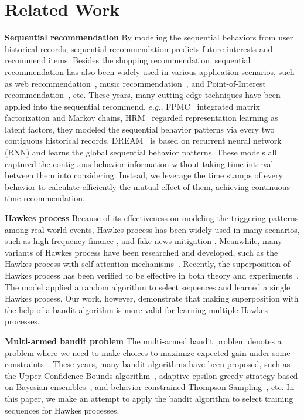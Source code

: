 \documentclass[runningheads]{llncs}
\begin{document}
\section{Related Work}
\textbf{Sequential recommendation}
By modeling the sequential behaviors from user historical records, sequential recommendation predicts future interests and recommend items. Besides the shopping recommendation, sequential recommendation has also been widely used in various application scenarios, such as web recommendation~\cite{zhang2015task}, music recommendation~\cite{chen2012playlist}, and Point-of-Interest recommendation~\cite{cheng2013you,feng2015personalized}, etc.
These years, many cutting-edge techniques have been applied into the sequential recommend, $e.g.$, FPMC~\cite{rendle2010factorizing} integrated matrix factorization and Markov chains, HRM~\cite{wang2015learning} regarded representation learning as latent factors, they modeled the sequential behavior patterns via every two contiguous historical records. 
DREAM~\cite{yu2016dynamic} is based on recurrent neural network (RNN) and learns the global sequential behavior patterns.
These models all captured the contiguous behavior information without taking time interval between them into considering. Instead, we leverage the time stamps of every behavior to calculate efficiently the mutual effect of them, achieving continuous-time recommendation.


\textbf{Hawkes process}
Because of its effectiveness on modeling the triggering patterns among real-world events, Hawkes process has been widely used in many scenarios, such as high frequency finance \cite{bacry2015hawkes}, and fake news mitigation \cite{farajtabar2017fake}. 
Meanwhile, many variants of Hawkes process have been researched and developed, such as the Hawkes process with self-attention mechanisms~\cite{zhang2019self,zuo2020transformer}. 
Recently, the superposition of Hawkes process has been verified to be effective in both theory and experiments~\cite{xu2018benefits}. 
The model applied a random algorithm to select sequences and learned a single Hawkes process.
Our work, however, demonstrate that making superposition with the help of a bandit algorithm is more valid for learning multiple Hawkes processes.

\textbf{Multi-armed bandit problem}
The multi-armed bandit problem denotes a problem where we need to make choices to maximize expected gain under some constraints~\cite{robbins1952some}. 
These years, many bandit algorithms have been proposed, such as the Upper Confidence Bounds algorithm~\cite{li2010contextual,chu2011contextual,bouneffouf2019optimal}, adaptive epsilon-greedy strategy based on Bayesian ensembles~\cite{gimelfarb2020epsilon}, and behavior constrained Thompson Sampling~\cite{balakrishnan2019incorporating}, etc.
In this paper, we make an attempt to apply the bandit algorithm to select training sequences for Hawkes processes.
\end{document}
